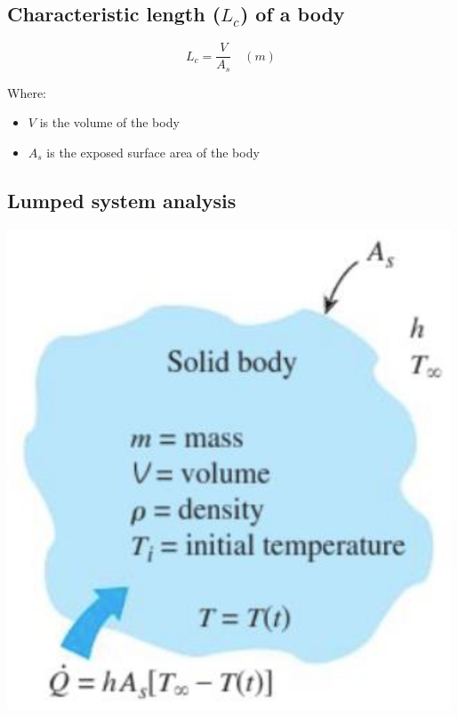 \documentclass[11pt]{article}
\begin{document}
\subsection{Characteristic length (\(L_c\)) of a body}
\label{sec:orgca0e547}
\[L_c = \frac{V}{A_s} \quad (\unit{m})\]

Where:
\begin{itemize}
\item \(V\) is the volume of the body
\item \(A_s\) is the exposed surface area of the body
\end{itemize}

 \newpage

\subsection{Lumped system analysis}
\label{sec:orgefb29bb}
\begin{center}
\includegraphics[width=.9\linewidth]{./images/lumped-system-analysis-diagram.png}
\end{center}
\end{document}
